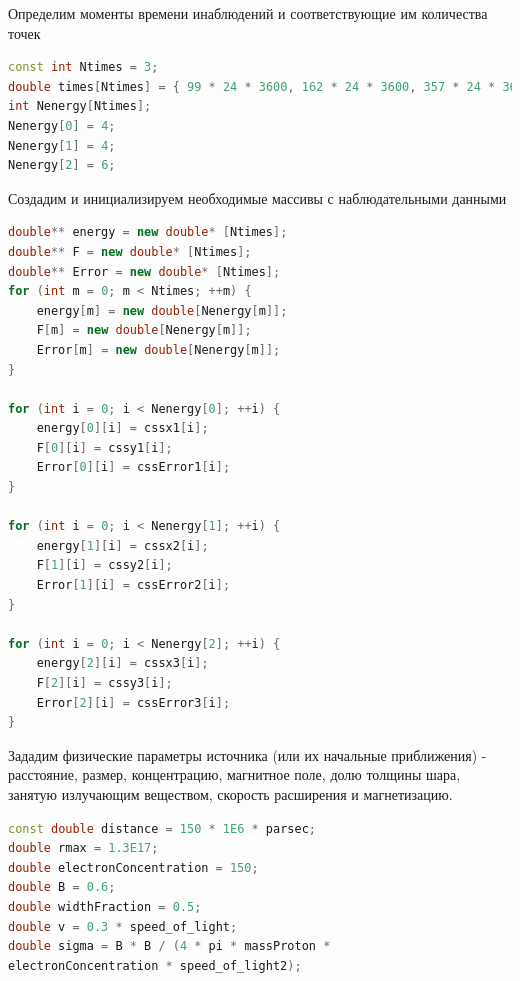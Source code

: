 Определим моменты времени инаблюдений и соответствующие им количества точек

\begin{lstlisting}[language=c++]
const int Ntimes = 3;
double times[Ntimes] = { 99 * 24 * 3600, 162 * 24 * 3600, 357 * 24 * 3600 };
int Nenergy[Ntimes];
Nenergy[0] = 4;
Nenergy[1] = 4;
Nenergy[2] = 6;
\end{lstlisting}
Создадим и инициализируем необходимые массивы с наблюдательными данными
\begin{lstlisting}[language=c++]
double** energy = new double* [Ntimes];
double** F = new double* [Ntimes];
double** Error = new double* [Ntimes];
for (int m = 0; m < Ntimes; ++m) {
	energy[m] = new double[Nenergy[m]];
	F[m] = new double[Nenergy[m]];
	Error[m] = new double[Nenergy[m]];
}

for (int i = 0; i < Nenergy[0]; ++i) {
	energy[0][i] = cssx1[i];
	F[0][i] = cssy1[i];
	Error[0][i] = cssError1[i];
}

for (int i = 0; i < Nenergy[1]; ++i) {
	energy[1][i] = cssx2[i];
	F[1][i] = cssy2[i];
	Error[1][i] = cssError2[i];
}

for (int i = 0; i < Nenergy[2]; ++i) {
	energy[2][i] = cssx3[i];
	F[2][i] = cssy3[i];
	Error[2][i] = cssError3[i];
}
\end{lstlisting}

Зададим физические параметры источника (или их начальные приближения) - расстояние, размер, концентрацию, магнитное поле, долю толщины шара, занятую излучающим веществом, скорость расширения и магнетизацию.

\begin{lstlisting}[language=c++]
const double distance = 150 * 1E6 * parsec;
double rmax = 1.3E17;
double electronConcentration = 150;
double B = 0.6;
double widthFraction = 0.5;
double v = 0.3 * speed_of_light;
double sigma = B * B / (4 * pi * massProton * 
electronConcentration * speed_of_light2);
\end{lstlisting}

